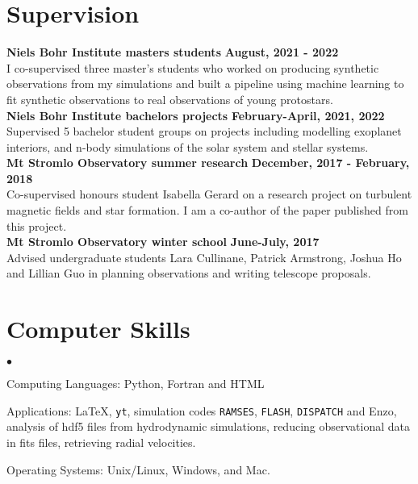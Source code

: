 \documentclass[margin,line]{res}
\newenvironment{list2}{
	\begin{list}{$\bullet$}{%
			\setlength{\itemsep}{0in}
			\setlength{\parsep}{0in} \setlength{\parskip}{0in}
			\setlength{\topsep}{0in} \setlength{\partopsep}{0in} 
			\setlength{\leftmargin}{0.2in}}}{\end{list}}
\begin{document}
\begin{resume}
            \section{\sc Supervision}
            {\bf  Niels Bohr Institute masters students} \hfill {\bf August, 2021 - 2022}\\
		I co-supervised three master's students who worked on producing synthetic observations from my simulations and built a pipeline using machine learning to fit synthetic observations to real observations of young protostars.\\
		{\bf  Niels Bohr Institute bachelors projects} \hfill {\bf February-April, 2021, 2022}\\
		Supervised 5 bachelor student groups on projects including modelling exoplanet interiors, and n-body simulations of the solar system and stellar systems.\\
        {\bf Mt Stromlo Observatory summer research} \hfill {\bf December, 2017 - February, 2018}\\
		Co-supervised honours student Isabella Gerard on a research project on turbulent magnetic fields and star formation. I am a co-author of the paper published from this project.\\
		{\bf Mt Stromlo Observatory winter school} \hfill {\bf June-July, 2017}\\
		Advised undergraduate students Lara Cullinane, Patrick Armstrong, Joshua Ho and Lillian Guo in planning observations and writing telescope proposals.
  
		\section{\sc Computer Skills} 
		\begin{list2}
			\item Computing Languages: Python, Fortran and HTML
			\item Applications: \LaTeX , \texttt{yt}, simulation codes \texttt{RAMSES}, \texttt{FLASH}, \texttt{DISPATCH} and Enzo, analysis of hdf5 files from hydrodynamic simulations, reducing observational data in fits files, retrieving radial velocities.  
			\item Operating Systems:  Unix/Linux, Windows, and Mac.
		\end{list2}
		

\end{resume}
\end{document}
